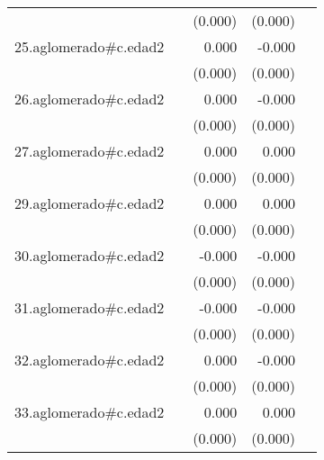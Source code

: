 {\begin{longtable}{l*{4}{D{.}{.}{-1}}}
            &                     &     (0.000)         &     (0.000)         &                     \\
\addlinespace
25.aglomerado#c.edad2&                     &       0.000\sym{*}  &      -0.000         &                     \\
            &                     &     (0.000)         &     (0.000)         &                     \\
\addlinespace
26.aglomerado#c.edad2&                     &       0.000\sym{*}  &      -0.000         &                     \\
            &                     &     (0.000)         &     (0.000)         &                     \\
\addlinespace
27.aglomerado#c.edad2&                     &       0.000\sym{**} &       0.000         &                     \\
            &                     &     (0.000)         &     (0.000)         &                     \\
\addlinespace
29.aglomerado#c.edad2&                     &       0.000\sym{*}  &       0.000         &                     \\
            &                     &     (0.000)         &     (0.000)         &                     \\
\addlinespace
30.aglomerado#c.edad2&                     &      -0.000         &      -0.000\sym{*}  &                     \\
            &                     &     (0.000)         &     (0.000)         &                     \\
\addlinespace
31.aglomerado#c.edad2&                     &      -0.000         &      -0.000\sym{***}&                     \\
            &                     &     (0.000)         &     (0.000)         &                     \\
\addlinespace
32.aglomerado#c.edad2&                     &       0.000         &      -0.000         &                     \\
            &                     &     (0.000)         &     (0.000)         &                     \\
\addlinespace
33.aglomerado#c.edad2&                     &       0.000\sym{***}&       0.000         &                     \\
            &                     &     (0.000)         &     (0.000)         &                     \\

\end{longtable}}
